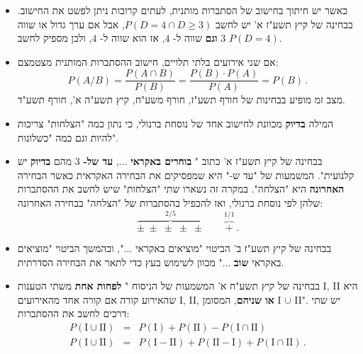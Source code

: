 \begin{itemize}

\item
כאשר יש חיתוך בחישוב של הסתברות מותנית, לעתים קרובות ניתן לפשט את החישוב. בבחינה של קיץ תשע"ז א' יש לחשב
$P(D=4\cap D\ge 3)$,
אבל אם ערך גדול או שווה
$3$
\textbf{וגם}
שווה ל-%
$4$,
אז הוא שווה ל-%
$4$, 
ולכן מספיק לחשב
$P(D=4)$.


\item
אם שני אירועים בלתי תלויים, חישוב ההסתברות המותנית מצטמצם:
\[
P(A/B) = \frac{P(A\cap B)}{P(B)} = \frac{P(B)\cdot P(A)}{P(A)}= P(B)\,.
\]
מצב זמ מופיע בבחינות של חורף תשע"ז, חורף משע"ח, קיץ תשע"ה א', חורף תשע"ד.



\item
המילה 
\textbf{בדיוק}
מכוונת לחישוב אחד של נוסחת ברנולי, כי נתון כמה "הצלחות" צריכות להיות וגם כמה "כשלונות".


\item
בבחינה של קיץ תשע"ז א' כתוב "%
\textbf{בוחרים באקראי}
$\ldots$,
\textbf{עד של-}
$3$
מהם
\textbf{בדיוק}
יש קלנועית". המשמעות של "עד ש-" היא שמפסיקים את הבחירה האקראית כאשר הבחירה 
\textbf{האחרונה} 
היא "הצלחה". במקרה זה נשארו שתי "הצלחות" שיש לחשב את ההסתברות שלהן לפי נוסחת ברנולי, ואז להכפיל בהסתברות של "הצלחה" בבחירה האחרונה:
\[
\overbrace{\pm\;\pm\;\pm\;\pm\;\pm}^{2/5}\quad\quad \overbrace{+}^{1/1}\,.
\]


\item
בבחינה של קיץ תשע"ז ב' הביטוי "מוציאים באקראי
$\ldots$",
ובהמשך הביטוי "מוציאים באקראי
\textbf{שוב}
$\ldots$"
מכוון לשימוש בעץ כדי לתאר את הבחירה הסדרתית.


\item
בבחינה של קיץ תשע"ח א' המשמעות של הניסוח "%
\textbf{לפחות אחת}
משתי הטענות I, II היא שהאירוע קורה אם קורה אחד מהאירועים I, II,
\textbf{או שניהם},
המסומן I
$\cup$
II".
יש שתי דרכים לחשב את ההסתברות:
\begin{eqnarray*}
P(\textrm{I} \cup \textrm{II}) &=& P(\textrm{I}) + P(\textrm{II}) - P(\textrm{I} \cap \textrm{II})\\
P(\textrm{I} \cup \textrm{II}) &=& P(\textrm{I}-\textrm{II}) + P(\textrm{II}-\textrm{I}) + P(\textrm{I} \cap \textrm{II})\,.
\end{eqnarray*}


\end{itemize}
